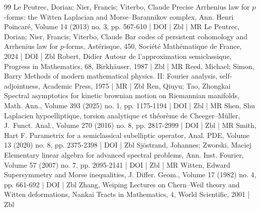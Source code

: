 \begin{thebibliography}{99}
 Le Peutrec, Dorian; Nier, Francis; Viterbo, Claude Precise Arrhenius law for $p$-forms: the Witten Laplacian and Morse–Barannikov complex, Ann. Henri Poincaré, Volume 14 (2013) no. 3, pp. 567-610 | DOI | Zbl | MR
 Le Peutrec, Dorian; Nier, Francis; Viterbo, Claude Bar codes of persistent cohomology and Arrhenius law for $p$-forms, Astérisque, 450, Société Mathématique de France, 2024 | DOI | Zbl
 Robert, Didier Autour de l’approximation semiclassique, Progress in Mathematics, 68, Birkhäuser, 1987 | Zbl | MR
 Reed, Michael; Simon, Barry Methods of modern mathematical physics. II: Fourier analysis, self-adjointness, Academic Press, 1975 | MR | Zbl
 Ren, Qiuyu; Tao, Zhongkai Spectral asymptotics for kinetic brownian motion on Riemannian manifolds, Math. Ann., Volume 393 (2025) no. 1, pp. 1175-1194 | DOI | Zbl | MR
 Shen, Shu Laplacien hypoelliptique, torsion analytique et théorème de Cheeger–Müller, J. Funct. Anal., Volume 270 (2016) no. 8, pp. 2817-2999 | DOI | Zbl | MR
 Smith, Hart F. Parametrix for a semiclassical subelliptic operator, Anal. PDE, Volume 13 (2020) no. 8, pp. 2375-2398 | DOI | Zbl
 Sjöstrand, Johannes; Zworski, Maciej Elementary linear algebra for advanced spectral problems, Ann. Inst. Fourier, Volume 57 (2007) no. 7, pp. 2095-2141 | DOI | Zbl | MR
 Witten, Edward Supersymmetry and Morse inequalities, J. Differ. Geom., Volume 17 (1982) no. 4, pp. 661-692 | DOI | Zbl
 Zhang, Weiping Lectures on Chern–Weil theory and Witten deformations, Nankai Tracts in Mathematics, 4, World Scientific, 2001 | Zbl
\end{thebibliography}
